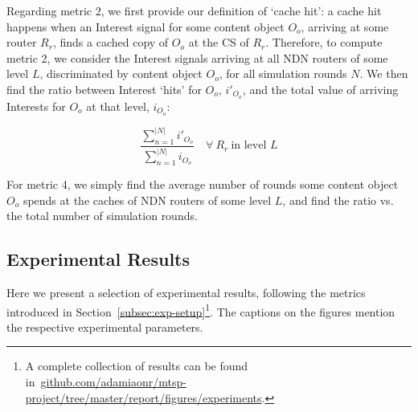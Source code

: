 Regarding metric 2, we first provide our definition of `cache hit': a cache hit 
happens when an Interest signal for some content object $O_o$, arriving at some 
router $R_r$, finds a cached copy of $O_o$ at the CS of $R_r$. Therefore, to 
compute metric 2, we consider the Interest signals 
arriving at all NDN routers of some level $L$, discriminated by content 
object $O_o$, for all simulation rounds $N$. We then find the ratio between Interest 
`hits' for $O_o$, $i'_{O_o}$, and the total value of arriving Interests for $O_o$ at that 
level, $i_{O_o}$:

\begin{equation}
    \frac{\sum_{n=1}^{|N|} i'_{O_o}}{\sum_{n=1}^{|N|} i_{O_o}} \quad \forall \ R_r \ \text{in level $L$}
    \label{eq:exp-setup-metrics-2}
\end{equation}\shortvertbreak

For metric 4, we simply find the average number of rounds 
some content object $O_o$ spends at the caches of NDN routers of some level $L$, and find 
the ratio vs. the total number of simulation rounds.

\subsection{Experimental Results}
\label{subsec:exp-results}

Here we present a selection of experimental results, following the metrics 
introduced in Section~\ref{subsec:exp-setup}\footnote{A complete collection of 
results can be found in~\url{github.com/adamiaonr/mtsp-project/tree/master/report/figures/experiments}.}. 
The captions on the figures mention the respective experimental parameters.\shortvertbreak



